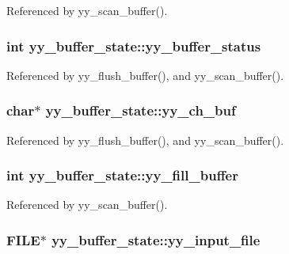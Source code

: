 Referenced by yy\_\-scan\_\-buffer().
\subsubsection[{yy\_\-buffer\_\-status}]{\setlength{\rightskip}{0pt plus 5cm}int {\bf yy\_\-buffer\_\-state::yy\_\-buffer\_\-status}}\label{structyy__buffer__state_70fd925d37a2f0454fbd0def675d106c}




Referenced by yy\_\-flush\_\-buffer(), and yy\_\-scan\_\-buffer().
\subsubsection[{yy\_\-ch\_\-buf}]{\setlength{\rightskip}{0pt plus 5cm}char$\ast$ {\bf yy\_\-buffer\_\-state::yy\_\-ch\_\-buf}}\label{structyy__buffer__state_d7b8df8d8a4688e57b0b8d3ca75adc85}




Referenced by yy\_\-flush\_\-buffer(), and yy\_\-scan\_\-buffer().
\subsubsection[{yy\_\-fill\_\-buffer}]{\setlength{\rightskip}{0pt plus 5cm}int {\bf yy\_\-buffer\_\-state::yy\_\-fill\_\-buffer}}\label{structyy__buffer__state_63d2afbb1d79a3fc63df9e12626f827d}




Referenced by yy\_\-scan\_\-buffer().
\subsubsection[{yy\_\-input\_\-file}]{\setlength{\rightskip}{0pt plus 5cm}FILE$\ast$ {\bf yy\_\-buffer\_\-state::yy\_\-input\_\-file}}\label{structyy__buffer__state_4843d1422e3276b636d475a3095bd948}




